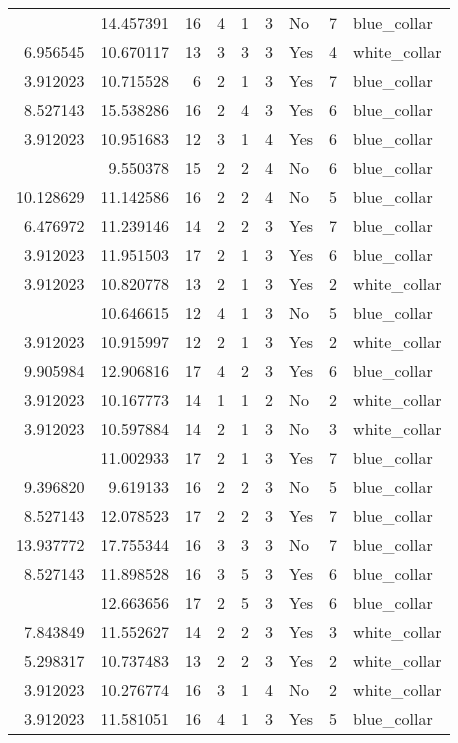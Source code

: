 \documentclass[
]{article}
\begin{document}
\begin{longtable}[t]{rrrrrllrl}
\addlinespace
3.912023 & 14.457391 & 16 & 4 & 1 & 3 & No & 7 & blue\_collar\\
6.956545 & 10.670117 & 13 & 3 & 3 & 3 & Yes & 4 & white\_collar\\
3.912023 & 10.715528 & 6 & 2 & 1 & 3 & Yes & 7 & blue\_collar\\
8.527143 & 15.538286 & 16 & 2 & 4 & 3 & Yes & 6 & blue\_collar\\
3.912023 & 10.951683 & 12 & 3 & 1 & 4 & Yes & 6 & blue\_collar\\
\addlinespace
8.022897 & 9.550378 & 15 & 2 & 2 & 4 & No & 6 & blue\_collar\\
10.128629 & 11.142586 & 16 & 2 & 2 & 4 & No & 5 & blue\_collar\\
6.476972 & 11.239146 & 14 & 2 & 2 & 3 & Yes & 7 & blue\_collar\\
3.912023 & 11.951503 & 17 & 2 & 1 & 3 & Yes & 6 & blue\_collar\\
3.912023 & 10.820778 & 13 & 2 & 1 & 3 & Yes & 2 & white\_collar\\
\addlinespace
3.912023 & 10.646615 & 12 & 4 & 1 & 3 & No & 5 & blue\_collar\\
3.912023 & 10.915997 & 12 & 2 & 1 & 3 & Yes & 2 & white\_collar\\
9.905984 & 12.906816 & 17 & 4 & 2 & 3 & Yes & 6 & blue\_collar\\
3.912023 & 10.167773 & 14 & 1 & 1 & 2 & No & 2 & white\_collar\\
3.912023 & 10.597884 & 14 & 2 & 1 & 3 & No & 3 & white\_collar\\
\addlinespace
3.912023 & 11.002933 & 17 & 2 & 1 & 3 & Yes & 7 & blue\_collar\\
9.396820 & 9.619133 & 16 & 2 & 2 & 3 & No & 5 & blue\_collar\\
8.527143 & 12.078523 & 17 & 2 & 2 & 3 & Yes & 7 & blue\_collar\\
13.937772 & 17.755344 & 16 & 3 & 3 & 3 & No & 7 & blue\_collar\\
8.527143 & 11.898528 & 16 & 3 & 5 & 3 & Yes & 6 & blue\_collar\\
\addlinespace
11.513425 & 12.663656 & 17 & 2 & 5 & 3 & Yes & 6 & blue\_collar\\
7.843849 & 11.552627 & 14 & 2 & 2 & 3 & Yes & 3 & white\_collar\\
5.298317 & 10.737483 & 13 & 2 & 2 & 3 & Yes & 2 & white\_collar\\
3.912023 & 10.276774 & 16 & 3 & 1 & 4 & No & 2 & white\_collar\\
3.912023 & 11.581051 & 16 & 4 & 1 & 3 & Yes & 5 & blue\_collar\\

\end{longtable}
\end{document}
